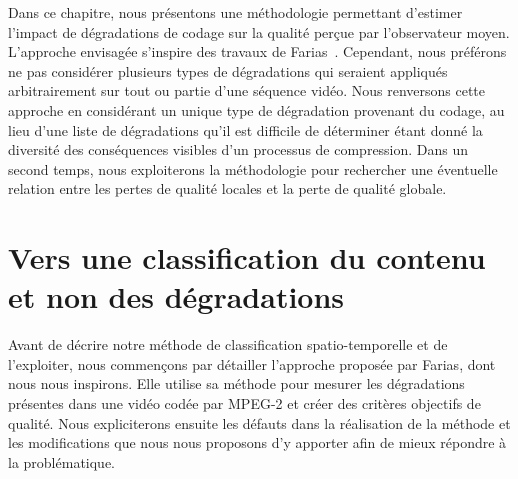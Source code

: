 Dans ce chapitre, nous présentons une méthodologie permettant d'estimer l'impact de dégradations de codage sur la qualité perçue par l'observateur moyen. L'approche envisagée s'inspire des travaux de Farias~\cite{farias-phd}. Cependant, nous préférons ne pas considérer plusieurs types de dégradations qui seraient appliqués arbitrairement sur tout ou partie d'une séquence vidéo. Nous renversons cette approche en considérant un unique type de dégradation provenant du codage, au lieu d'une liste de dégradations qu'il est difficile de déterminer étant donné la diversité des conséquences visibles d'un processus de compression. Dans un second temps, nous exploiterons la méthodologie pour rechercher une éventuelle relation entre les pertes de qualité locales et la perte de qualité globale. %


\section{Vers une classification du contenu et non des dégradations}
Avant de décrire notre méthode de classification spatio-temporelle et de l'exploiter, nous commençons par détailler l'approche proposée par Farias, dont nous nous inspirons. Elle utilise sa méthode pour mesurer les dégradations présentes dans une vidéo codée par MPEG-2 et créer des critères objectifs de qualité. Nous expliciterons ensuite les défauts dans la réalisation de la méthode et les modifications que nous nous proposons d'y apporter afin de mieux répondre à la problématique.


